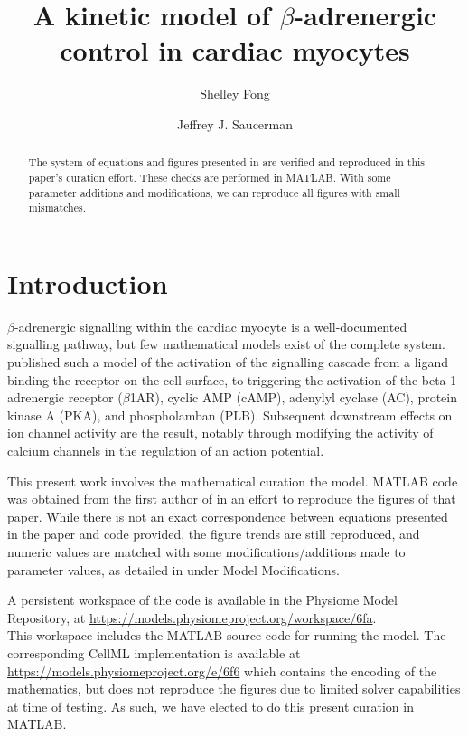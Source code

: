 \documentclass[fleqn,10pt]{physiome}
\title{A kinetic model of $\beta$-adrenergic control in cardiac myocytes}
\author[1][s.fong@auckland.ac.nz]{Shelley Fong}
\author[2]{Jeffrey J. Saucerman}
\affil[1]{Auckland Bioengineering Institute, The University of Auckland, New Zealand}
\affil[2]{Biomedical Engineering, The University of Virginia, USA}
\begin{document}
\maketitle

\begin{abstract}
The system of equations and figures presented in \cite{saucerman2003} are verified and reproduced in this paper's curation effort. These checks are performed in MATLAB. With some parameter additions and modifications, we can reproduce all figures with small mismatches.
\end{abstract}




\section{Introduction}

$\beta$-adrenergic signalling within the cardiac myocyte is a well-documented signalling pathway, but few mathematical models exist of the complete system. \cite{saucerman2003} published such a model of the activation of the signalling cascade from a ligand  binding the receptor on the cell surface, to triggering the activation of the beta-1 adrenergic receptor ($\beta$1AR), cyclic AMP (cAMP), adenylyl cyclase (AC), protein kinase A (PKA), and phospholamban (PLB). Subsequent downstream effects on ion channel activity are the result, notably through modifying the activity of calcium channels in the regulation of an action potential.

This present work involves the mathematical curation the model.
MATLAB \citep{MATLAB:2017} code was obtained from the first author of \cite{saucerman2003} in an effort to reproduce the figures of that paper. While there is not an exact correspondence between equations presented in the paper and code provided, the figure trends are still reproduced, and numeric values are matched with some modifications/additions made to parameter values, as detailed in under Model Modifications.

A persistent workspace of the code is available in the Physiome Model Repository, at 
 \url{https://models.physiomeproject.org/workspace/6fa}.\\
This workspace includes the MATLAB source code for running the model. The corresponding CellML \citep{cuellar} implementation is available at \url{https://models.physiomeproject.org/e/6f6} which contains the encoding of the mathematics, but does not reproduce the figures due to limited solver capabilities at time of testing. As such, we have elected to do this present curation in MATLAB.
\end{document}
